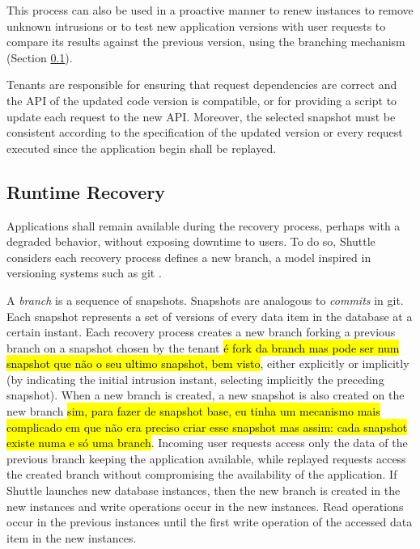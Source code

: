 This process can also be used in a proactive manner to renew instances to remove unknown intrusions \cite{Castro2002,Sousa2010} or to test new application versions with user requests to compare its results against the previous version, using the branching mechanism  (Section \ref{sec:arch:runtime_recovery}).

Tenants are responsible for ensuring that request dependencies are correct and the {API} of the updated code version is compatible, or for providing a script to update each request to the new \ac{API}. Moreover, the selected snapshot must be consistent according to the specification of the updated version or every request executed since the application begin shall be replayed.



\subsection{Runtime Recovery}
\label{sec:arch:runtime_recovery}

Applications shall remain available during the recovery process, perhaps with a degraded behavior, without exposing downtime to users. To do so, Shuttle considers each recovery process defines a new branch, a model inspired in versioning systems such as git \cite{git}.

A \emph{branch} is a sequence of snapshots. Snapshots are analogous to \textit{commits} in git. Each snapshot represents a set of versions of every data item in the database at a certain instant. Each recovery process creates a new branch forking a previous branch on a snapshot chosen by the tenant \hl{é fork da branch mas pode ser num snapshot que não o seu ultimo snapshot, bem visto}, either explicitly or implicitly (by indicating the initial intrusion instant, selecting implicitly the preceding snapshot). When a new branch is created, a new snapshot is also created on the new branch \hl{sim, para fazer de snapshot base, eu tinha um mecanismo mais complicado em que não era preciso criar esse snapshot mas assim: cada snapshot existe numa e só uma branch}. Incoming user requests access only the data of the previous branch keeping the application available, while replayed requests access the created branch without compromising the availability of the application. If Shuttle launches new database instances, then the new branch is created in the new instances and write operations occur in the new instances. Read operations occur in the previous instances until the first write operation of the accessed data item in the new instances.

